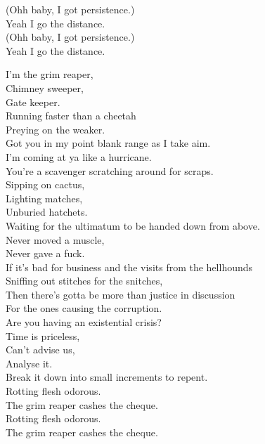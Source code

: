 (Ohh baby, I got persistence.) \\
Yeah I go the distance. \\
(Ohh baby, I got persistence.) \\
Yeah I go the distance. \\





I'm the grim reaper, \\
Chimney sweeper, \\
Gate keeper. \\
Running faster than a cheetah \\
Preying on the weaker. \\
Got you in my point blank range as I take aim. \\
I'm coming at ya like a hurricane. \\

You're a scavenger scratching around for scraps. \\
Sipping on cactus, \\
Lighting matches, \\
Unburied hatchets. \\
Waiting for the ultimatum to be handed down from above. \\
Never moved a muscle, \\
Never gave a fuck. \\

If it's bad for business and the visits from the hellhounds \\
Sniffing out stitches for the snitches, \\
Then there's gotta be more than justice in discussion \\
For the ones causing the corruption. \\

Are you having an existential crisis? \\
Time is priceless, \\
Can't advise us, \\
Analyse it. \\
Break it down into small increments to repent. \\

Rotting flesh odorous. \\
The grim reaper cashes the cheque. \\
Rotting flesh odorous. \\
The grim reaper cashes the cheque. \\

